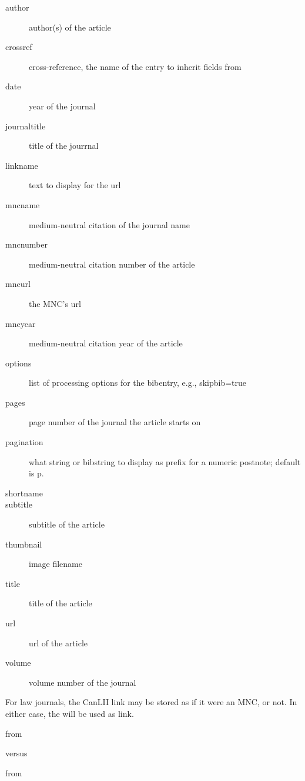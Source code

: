 \begin{description}
\item[author]author(s) of the article
\item[crossref]cross-reference, the name of the entry to inherit fields from
\item[date]year of the journal
\item[journaltitle]title of the jourrnal
\item[linkname]text to display for the url
\item[mncname]medium-neutral citation of the journal name
\item[mncnumber]medium-neutral citation number of the article
\item[mncurl]the MNC’s url
\item[mncyear]medium-neutral citation year of the article
\item[options]list of processing options for the bibentry, e.g., skipbib=true
\item[pages]page number of the journal the article starts on
\item[pagination]what string or bibstring to display as prefix for a numeric postnote; default is p.
\item[shortname] 
\item[subtitle]subtitle of the article
\item[thumbnail]image filename
\item[title]title of the article
\item[url]url of the article
\item[volume]volume number of the journal
\end{description}

\p For law journals, the CanLII link may be stored as if it were an MNC, or not. In either case, the  will be used as link.

\begin{myquotation}
\noindent{}
\end{myquotation}
from


\colorbox{blue!12}{\begin{minipage}{\textwidth}\end{minipage}}

versus
\begin{myquotation}
\noindent{}
\end{myquotation}
from

\colorbox{blue!12}{\begin{minipage}{\textwidth}\end{minipage}}

